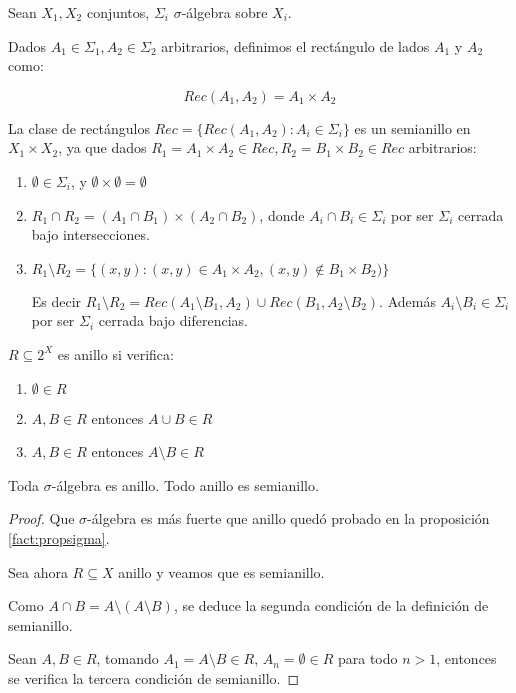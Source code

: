 \begin{example}
 \label{ex:rectangulos}
 \begin{definition*}
  Sean $X_1, X_2$ conjuntos, $\Sigma_i$ $\sigma$-álgebra sobre $X_i$. 
  
  Dados $A_1 \in \Sigma_1, A_2 \in \Sigma_2$ arbitrarios, definimos el rectángulo de lados $A_1$ y $A_2$ como:
  
  \[Rec(A_1, A_2) = A_1 \times A_2\]
 \end{definition*}
 
 
 La clase de rectángulos $Rec = \{Rec(A_1, A_2): A_i \in \Sigma_i\}$ es un semianillo en $X_1 \times X_2$,
 ya que dados $R_1 = A_1 \times A_2 \in Rec, R_2 = B_1 \times B_2 \in Rec$ arbitrarios:
 
 \begin{enumerate}
  \item $\emptyset \in \Sigma_i$, y $\emptyset \times \emptyset = \emptyset$
  \item $R_1 \cap R_2 = (A_1 \cap B_1) \times (A_2 \cap B_2)$, donde $A_i \cap B_i \in \Sigma_i$ por ser 
  $\Sigma_i$ cerrada bajo intersecciones.
  \item $R_1 \setminus R_2 = \{(x,y): (x,y) \in A_1 \times A_2, (x,y) \notin B_1 \times B_2)\}$
  
  Es decir $R_1 \setminus R_2 = Rec(A_1\setminus B_1, A_2) \cup Rec(B_1, A_2\setminus B_2)$. Además
  $A_i \setminus B_i \in \Sigma_i$ por ser $\Sigma_i$ cerrada bajo diferencias.
 \end{enumerate}

\end{example}


\begin{definition}[Anillo en $X$]
 $R\subseteq 2^X$ es anillo si verifica:
 
 \begin{enumerate}[i]
  \item $\emptyset \in R$
  \item $A,B \in R$ entonces $A\cup B \in R$
  \item $A,B \in R$ entonces $A\setminus B \in R$
 \end{enumerate}
\end{definition}


\begin{fact}
 Toda $\sigma$-álgebra es anillo. Todo anillo es semianillo.
\end{fact}

\begin{proof}
 Que $\sigma$-álgebra es más fuerte que anillo quedó probado en la proposición \ref{fact:propsigma}.
 
 Sea ahora $R \subseteq X$ anillo y veamos que es semianillo.

 Como $A\cap B = A\setminus (A\setminus B)$, se deduce la segunda condición de la definición de semianillo.
 
 Sean $A, B \in R$, tomando $A_1 = A\setminus B \in R$, $A_n = \emptyset \in R$ para todo $n > 1$, entonces se 
 verifica la tercera condición de semianillo.
\end{proof}

